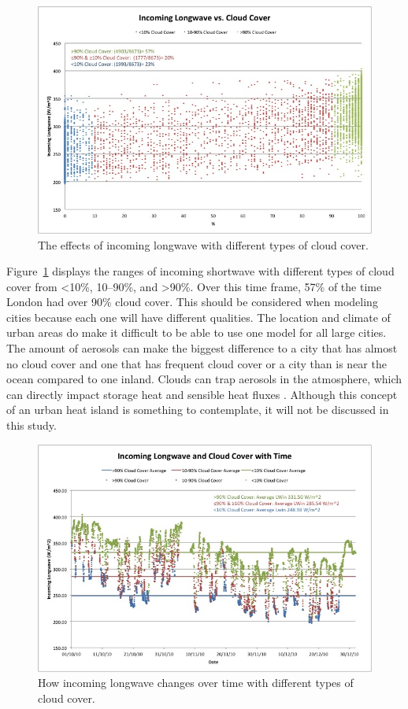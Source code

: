 \documentclass[a4paper,titlepage, twoside]{report}
\begin{document}
\begin{figure}
\includegraphics[width=\textwidth]{2.jpg}
\caption{The effects of incoming longwave with different types of cloud cover.}
\label{fig:longwave-2}
\end{figure}

Figure~\ref{fig:longwave-2} displays the ranges of incoming shortwave with different types of cloud cover from <10\%, 10--90\%, and  >90\%.  Over this time frame, 57\% of the time London had over 90\% cloud cover.  This should be considered when modeling cities because each one will have different qualities.  The location and climate of urban areas do make it difficult to be able to use one model for all large cities.  The amount of aerosols can make the biggest difference to a city that has almost no cloud cover and one that has frequent cloud cover or a city than is near the ocean compared to one inland. Clouds can trap aerosols in the atmosphere, which can directly impact storage heat and sensible heat fluxes \parencite{kotthaus1}.  Although this concept of an urban heat island is something to contemplate, it will not be discussed in this study.

\begin{figure}
\includegraphics[width=\textwidth]{3.jpg}
\caption{How incoming longwave changes over time with different types of cloud cover.}
\label{fig:longwave-3}
\end{figure}
\end{document}

